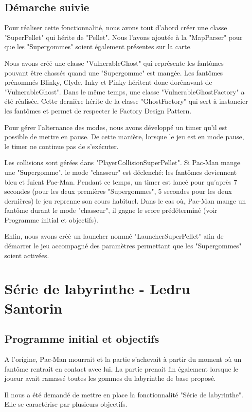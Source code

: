 \documentclass[a4paper,12pt]{report} %
\begin{document}
\subsection{Démarche suivie}
Pour réaliser cette fonctionnalité, nous avons tout d'abord créer une classe "SuperPellet" qui hérite de "Pellet". Nous l'avons ajoutée à la "MapParser" pour que les "Supergommes" soient également présentes sur la carte.

Nous avons créé une classe "VulnerableGhost" qui représente les fantômes pouvant être chassés quand une "Supergomme" est mangée. Les fantômes prénommés Blinky, Clyde, Inky et Pinky héritent donc dorénavant de "VulnerableGhost". Dans le même temps, une classe "VulnerableGhostFactory" a été réalisée. Cette dernière hérite de la classe "GhostFactory" qui sert à instancier les fantômes et permet de respecter le Factory Design Pattern.

Pour gérer l'alternance des modes, nous avons développé un timer qu'il est possible de mettre en pause. De cette manière, lorsque le jeu est en mode pause, le timer ne continue pas de s'exécuter.

Les collisions sont gérées dans "PlayerCollisionSuperPellet". Si Pac-Man mange une "Supergomme", le mode "chasseur" est déclenché: les fantômes deviennent bleu et fuient Pac-Man. Pendant ce temps, un timer est lancé pour qu'après 7 secondes (pour les deux premières "Supergommes", 5 secondes pour les deux dernières) le jeu reprenne son cours habituel. Dans le cas où, Pac-Man mange un fantôme durant le mode "chasseur", il gagne le score prédéterminé (voir Programme initial et objectifs).

Enfin, nous avons créé un launcher nommé "LauncherSuperPellet" afin de démarrer le jeu accompagné des paramètres permettant que les "Supergommes" soient activées.

\section{Série de labyrinthe - Ledru Santorin}
\subsection{Programme initial et objectifs}
A l'origine, Pac-Man mourrait et la partie s'achevait à partir du moment où un fantôme
rentrait en contact avec lui. La partie prenait fin également lorsque
le joueur avait ramassé toutes les gommes du labyrinthe de base proposé.

Il nous a été demandé de mettre en place la fonctionnalité "Série de labyrinthe". Elle se caractérise par plusieurs objectifs.
\end{document}
